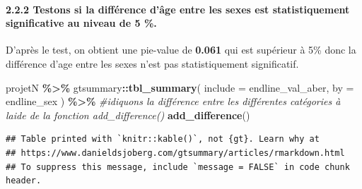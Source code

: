 \documentclass[
]{article}
\newenvironment{Shaded}{\begin{snugshade}}{\end{snugshade}}
\newcommand{\AttributeTok}[1]{\textcolor[rgb]{0.13,0.29,0.53}{#1}}
\newcommand{\CommentTok}[1]{\textcolor[rgb]{0.56,0.35,0.01}{\textit{#1}}}
\newcommand{\FunctionTok}[1]{\textcolor[rgb]{0.13,0.29,0.53}{\textbf{#1}}}
\newcommand{\NormalTok}[1]{#1}
\newcommand{\SpecialCharTok}[1]{\textcolor[rgb]{0.81,0.36,0.00}{\textbf{#1}}}
\begin{document}
\hypertarget{testons-si-la-diffuxe9rence-duxe2ge-entre-les-sexes-est-statistiquement-significative-au-niveau-de-5-.}{%
\paragraph{2.2.2 Testons si la différence d'âge entre les sexes est
statistiquement significative au niveau de 5
\%.}\label{testons-si-la-diffuxe9rence-duxe2ge-entre-les-sexes-est-statistiquement-significative-au-niveau-de-5-.}}

D'après le test, on obtient une pie-value de \textbf{0.061} qui est
supérieur à 5\% donc la différence d'age entre les sexes n'est pas
statistiquement significatif.

\begin{Shaded}
\begin{Highlighting}[]
\NormalTok{projetN }\SpecialCharTok{\%\textgreater{}\%}
\NormalTok{  gtsummary}\SpecialCharTok{::}\FunctionTok{tbl\_summary}\NormalTok{(}
    \AttributeTok{include =}\NormalTok{ endline\_val\_aber,}
    \AttributeTok{by =}\NormalTok{ endline\_sex}
\NormalTok{  ) }\SpecialCharTok{\%\textgreater{}\%}
  \CommentTok{\#idiquons la différence entre les différentes catégories à l\textquotesingle{}aide de la fonction add\_difference()}
  \FunctionTok{add\_difference}\NormalTok{()}
\end{Highlighting}
\end{Shaded}

\begin{verbatim}
## Table printed with `knitr::kable()`, not {gt}. Learn why at
## https://www.danieldsjoberg.com/gtsummary/articles/rmarkdown.html
## To suppress this message, include `message = FALSE` in code chunk header.
\end{verbatim}
\end{document}
